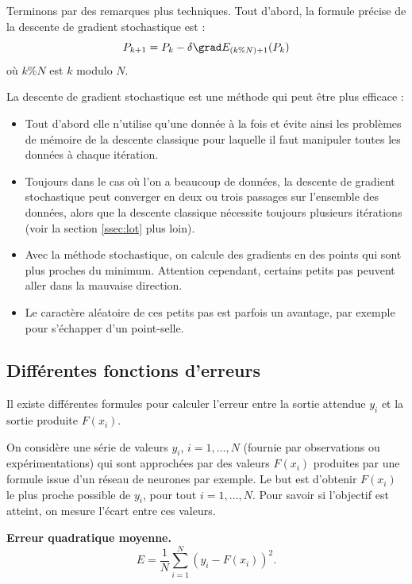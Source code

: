 \documentclass[10pt,class=report,crop=false]{standalone}
\begin{document}
Terminons par des remarques plus techniques.
Tout d'abord, la formule précise de la descente de gradient stochastique est :
$$P_{k+1} = P_k - \delta \grad E_{(k \% N)+1} (P_k)$$
où $k \% N$ est \og{}$k$ modulo $N$\fg{}.



La descente de gradient stochastique est une méthode qui peut être plus efficace : 
\begin{itemize}
  \item Tout d'abord elle n'utilise qu'une donnée à la fois et évite ainsi les problèmes de mémoire de la descente classique pour laquelle il faut manipuler toutes les données à chaque itération.
  \item Toujours dans le cas où l'on a beaucoup de données, la descente de gradient stochastique peut converger en deux ou trois passages sur l'ensemble des données, alors que la descente classique nécessite toujours plusieurs itérations (voir la section \ref{ssec:lot} plus loin).
  \item Avec la méthode stochastique, on calcule des gradients en des points qui sont plus proches du minimum. Attention cependant, certains petits pas peuvent aller dans la mauvaise direction.
  \item Le caractère aléatoire de ces petits pas est parfois un avantage, par exemple pour s'échapper d'un point-selle.
\end{itemize}






\subsection{Différentes fonctions d'erreurs}

Il existe différentes formules pour calculer l'erreur entre la sortie attendue $y_i$ et la sortie produite $F(x_i)$.

On considère une série de valeurs $y_i$, $i=1,\ldots,N$ (fournie par observations ou expérimentations) qui sont approchées par des valeurs $F(x_i)$ produites par une formule issue d'un réseau de neurones par exemple.
Le but est d'obtenir $F(x_i)$ le plus proche possible de $y_i$, pour tout $i=1,\ldots,N$. Pour savoir si l'objectif est atteint, on mesure l'écart entre ces valeurs.

\textbf{Erreur quadratique moyenne.}
$$E = \frac{1}{N} \sum_{i=1}^N (y_i-F(x_i))^2.$$
\end{document}
